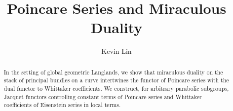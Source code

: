 \documentclass[10pt]{amsart}
\title{Poincare Series and Miraculous Duality}
\author{Kevin Lin}
\numberwithin{equation}{subsubsection}
\theoremstyle{kevintheoremstyle}
\begin{document}
\maketitle

\begin{abstract}
In the setting of global geometric Langlands, we show that miraculous duality on the stack of principal bundles on a curve intertwines the functor of Poincare series with the dual functor to Whittaker coefficients. We construct, for arbitrary parabolic subgroups, Jacquet functors controlling constant terms of Poincare series and Whittaker coefficients of Eisenstein series in local terms.
\end{abstract}











\printbibliography
\end{document}
